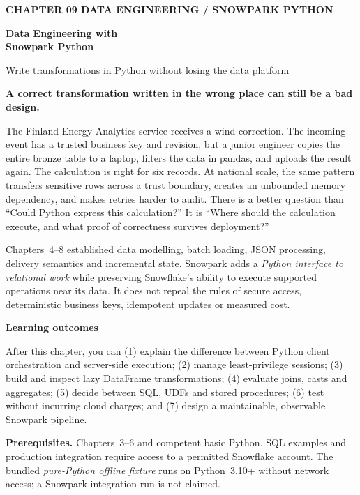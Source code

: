 \documentclass[11pt,twoside]{article}
\begin{document}
{\sffamily\bfseries\fontsize{9}{11}\selectfont\color{steelblue} CHAPTER 09 \hfill DATA ENGINEERING / SNOWPARK PYTHON}\par\vspace{3mm}
{\sffamily\bfseries\fontsize{21.2}{24.5}\selectfont\color{navy} Data Engineering with\\Snowpark Python}\par\vspace{2mm}
{\sffamily\fontsize{11.1}{14}\selectfont\color{steelblue} Write transformations in Python without losing the data platform}\par\vspace{4mm}
\begin{insight}\textbf{A correct transformation written in the wrong place can still be a bad design.}\par
The Finland Energy Analytics service receives a wind correction. The incoming event has a trusted business key and revision, but a junior engineer copies the entire bronze table to a laptop, filters the data in pandas, and uploads the result again. The calculation is right for six records. At national scale, the same pattern transfers sensitive rows across a trust boundary, creates an unbounded memory dependency, and makes retries harder to audit. There is a better question than ``Could Python express this calculation?'' It is ``Where should the calculation execute, and what proof of correctness survives deployment?''\end{insight}
Chapters~4--8 established data modelling, batch loading, JSON processing, delivery semantics and incremental state. Snowpark adds a \emph{Python interface to relational work} while preserving Snowflake's ability to execute supported operations near its data. It does not repeal the rules of secure access, deterministic business keys, idempotent updates or measured cost.
\begin{whitebox}\textbf{Learning outcomes}\par
After this chapter, you can (1) explain the difference between Python client orchestration and server-side execution; (2) manage least-privilege sessions; (3) build and inspect lazy DataFrame transformations; (4) evaluate joins, casts and aggregates; (5) decide between SQL, UDFs and stored procedures; (6) test without incurring cloud charges; and (7) design a maintainable, observable Snowpark pipeline.\end{whitebox}
\textbf{Prerequisites.} Chapters~3--6 and competent basic Python. SQL examples and production integration require access to a permitted Snowflake account. The bundled \emph{pure-Python offline fixture} runs on Python~3.10+ without network access; a Snowpark integration run is not claimed.
\end{document}
